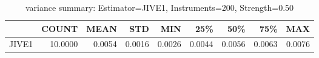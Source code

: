 \begin{table}[ht]
\centering
\caption{variance summary: Estimator=JIVE1, Instruments=200, Strength=0.50}
\begin{tabular}{lrrrrrrrr}
\toprule
 & COUNT & MEAN & STD & MIN & 25\% & 50\% & 75\% & MAX \\
\midrule
JIVE1 & 10.0000 & 0.0054 & 0.0016 & 0.0026 & 0.0044 & 0.0056 & 0.0063 & 0.0076 \\
\bottomrule
\end{tabular}
\end{table}
